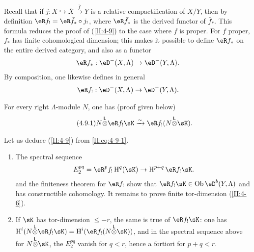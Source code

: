 Recall that if $j:X\hookrightarrow \bar X \xrightarrow{\bar f} Y$ is a
relative compactification of $X/Y$, then by definition
$\eR f_! = \eR \bar f_* \circ j_!$, where $\eR \bar f_*$ is the derived
functor of $\bar f_*$. This formula reduces the proof of (\ref{II:4-9}) to
the case where $f$ is proper. For $f$ proper, $f_*$ has finite cohomological
dimension; this makes it possible to define $\eR f_*$ on the entire derived
category, and also as a functor
\[
  \eR f_* : \eD^-(X,\Lambda) \to \eD^-(Y,\Lambda) \text{.}
\]
By composition, one likewise defines in general
\[
  \eR f_! : \eD^-(X,\Lambda) \to \eD^-(Y,\Lambda) \text{.}
\]

For every right $\Lambda$-module $N$, one has (proof given below)
\begin{equation*}\tag{4.9.1}\label{II:eq:4-9-1}
  N\lotimes \eR f_! \sK \iso \eR f_! (N\lotimes \sK) \text{.}
\end{equation*}

Let us deduce (\ref{II:4-9}) from \eqref{II:eq:4-9-1}.
\begin{enumerate}[\indent a)]
  \item The spectral sequence
    \[
      E_2^{p q} = \eR^p f_! \h^q(\sK) \rightarrow \h^{p+q} \eR f_! \sK \text{.}
    \]
    and the finiteness theorem for $\eR f_!$ show that
    $\eR f_!\sK\in \ob \eD^b(Y,\Lambda)$ and has constructible cohomology.
    It remains to prove finite tor-dimension (\ref{II:4-6}).
  \item If $\sK$ has tor-dimension $\leqslant -r$, the same is true of
    $\eR f_! \sK$: one has
    $\h^i(N\lotimes \eR f_! \sK) = \h^i(\eR f_!(N\lotimes \sK))$, and in the
    spectral sequence above for $N\lotimes \sK$, the $E_2^{p q}$ vanish for
    $q<r$, hence a fortiori for $p+q<r$.
\end{enumerate}

